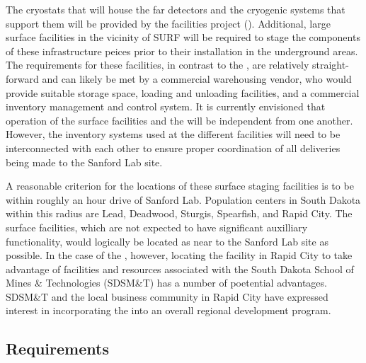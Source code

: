 The cryostats that will house the far detectors and the cryogenic systems 
that support them will be provided by the facilities project ().
Additional, large surface facilities in the vicinity of SURF will be 
required to stage the components of these infrastructure peices prior to 
their installation in the underground areas.  The requirements for these
facilities, in contrast to the , are relatively straight-forward and 
can likely be met by a commercial warehousing vendor, who would provide 
suitable storage space, loading and unloading facilities, and a commercial 
inventory management and control system.  It is currently envisioned that 
operation of the  surface facilities and the   
will be independent from one another.  However, the inventory systems used 
at the different facilities will need to be interconnected with each other 
to ensure proper coordination of all deliveries being made to the Sanford 
Lab site.

A reasonable criterion for the locations of these surface staging facilities 
is to be within roughly an hour drive of Sanford Lab.  Population centers 
in South Dakota within this radius are Lead, Deadwood, Sturgis, Spearfish, 
and Rapid City.  The  surface facilities, which are not expected 
to have significant auxilliary functionality, would logically be located as 
near to the Sanford Lab site as possible.  In the case of the  
, however, locating the facility in Rapid City to take advantage of 
facilities and resources associated with the South Dakota School of Mines 
\& Technologies (SDSM\&T) has a number of poetential advantages.  SDSM\&T 
and the local business community in Rapid City have expressed interest in 
incorporating the   into an overall regional development 
program.     

\subsection{Requirements}

